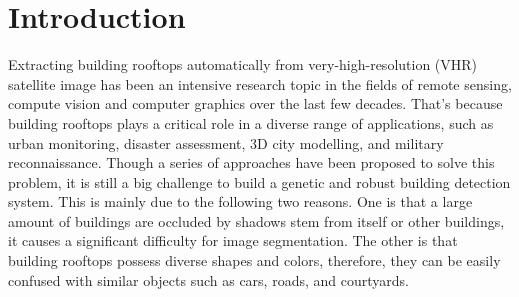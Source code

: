 \section{Introduction}
Extracting building rooftops automatically from very-high-resolution (VHR) satellite image has been an intensive research topic in the fields of remote sensing, compute vision  and computer graphics  over the last few decades. That's because building rooftops plays a critical role in  a diverse range of applications, such as  urban monitoring, disaster assessment, 3D city modelling, and military reconnaissance. Though a series of approaches have been proposed to solve this problem, it is still a big challenge to  
build a genetic and robust building detection system. This is mainly due to the following two reasons. One is that a large amount of buildings are occluded by shadows stem from itself or other buildings, it causes a significant difficulty for image segmentation. The other is that building rooftops possess diverse shapes and colors, therefore, they can be easily confused with similar objects such as cars, roads, and courtyards. 
	

